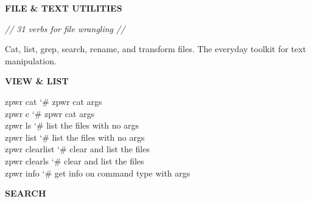 \documentclass[11pt,a4paper,twoside]{book}
\begin{document}
\vspace{10pt}
{\large\bfseries\color{neoncyan} FILE \& TEXT UTILITIES}\vspace{6pt}

{\small\itshape\color{dimtext} // 31 verbs for file wrangling //}

Cat, list, grep, search, rename, and transform files. The everyday toolkit for text manipulation.


\vspace{12pt}
{\bfseries\color{neonyellow} VIEW \& LIST}\vspace{4pt}

\begin{codebox}
\color{neongreen}zpwr cat                   {\char`\#} zpwr cat args\\
\color{neongreen}zpwr c                     {\char`\#} zpwr cat args\\
\color{neongreen}zpwr ls                    {\char`\#} list the files with no args\\
\color{neongreen}zpwr list                  {\char`\#} list the files with no args\\
\color{neongreen}zpwr clearlist             {\char`\#} clear and list the files\\
\color{neongreen}zpwr clearls               {\char`\#} clear and list the files\\
\color{neongreen}zpwr info                  {\char`\#} get info on command type with args\\
\end{codebox}


\vspace{12pt}
{\bfseries\color{neonyellow} SEARCH}\vspace{4pt}
\end{document}
